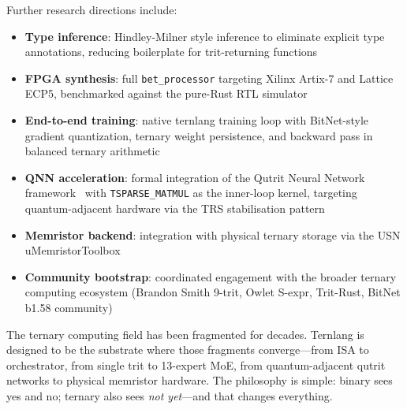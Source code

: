 \documentclass[journal,10pt,twocolumn]{IEEEtran}
\begin{document}
Further research directions include:

\begin{itemize}
  \item \textbf{Type inference}: Hindley-Milner style inference to eliminate
        explicit type annotations, reducing boilerplate for trit-returning
        functions
  \item \textbf{FPGA synthesis}: full \texttt{bet\_processor} targeting
        Xilinx Artix-7 and Lattice ECP5, benchmarked against the pure-Rust RTL
        simulator
  \item \textbf{End-to-end training}: native ternlang training loop with
        BitNet-style gradient quantization, ternary weight persistence, and
        backward pass in balanced ternary arithmetic
  \item \textbf{QNN acceleration}: formal integration of the Qutrit Neural
        Network framework~\cite{kepp2026qnn} with \texttt{TSPARSE\_MATMUL} as
        the inner-loop kernel, targeting quantum-adjacent hardware via the
        TRS stabilisation pattern
  \item \textbf{Memristor backend}: integration with physical ternary storage
        via the USN uMemristorToolbox~\cite{bos2020ternary}
  \item \textbf{Community bootstrap}: coordinated engagement with the broader
        ternary computing ecosystem (Brandon Smith 9-trit, Owlet S-expr,
        Trit-Rust, BitNet b1.58 community)
\end{itemize}

The ternary computing field has been fragmented for decades. Ternlang is
designed to be the substrate where those fragments converge—from ISA to
orchestrator, from single trit to 13-expert MoE, from quantum-adjacent
qutrit networks to physical memristor hardware. The philosophy is simple:
binary sees yes and no; ternary also sees \emph{not yet}—and that changes
everything.



\end{document}
